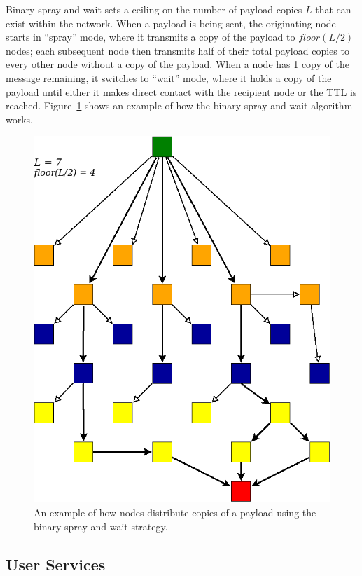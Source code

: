 \documentclass[12pt]{article}
\begin{document}
    Binary spray-and-wait sets a ceiling on the number of payload copies \(L\) that can exist within the network. When a payload is being sent, the originating node starts in ``spray'' mode, where it transmits a copy of the payload to \(floor(L/2)\) nodes; each subsequent node then transmits half of their total payload copies to every other node without a copy of the payload. When a node has 1 copy of the message remaining, it switches to ``wait'' mode, where it holds a copy of the payload until either it makes direct contact with the recipient node or the TTL is reached. Figure~\ref{fig:spraywait} shows an example of how the binary spray-and-wait algorithm works.
    
    \begin{figure}[h]
      \centering{}
      \includegraphics[scale=0.45]{Diagram2.png}
      \caption{An example of how nodes distribute copies of a payload using the binary spray-and-wait strategy.}
      \label{fig:spraywait}
    \end{figure}
    
  \subsection{User Services}
  
\end{document}

